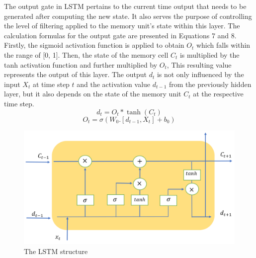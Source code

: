 \documentclass{article}
\begin{document}
The output gate in LSTM pertains to the current time output that needs to be generated after computing the new state. It also serves the purpose of controlling the level of filtering applied to the memory unit's state within this layer. The calculation formulas for the output gate are presented in Equations 7 and 8.  Firstly, the sigmoid activation function is applied to obtain  $O_t$  which falls within the range of  [0, 1]. Then, the state of the memory cell  $C_t$ is multiplied by the tanh activation function and further multiplied by  $O_t$, This resulting value represents the output of this layer. The output $d_t$ is not only influenced by the input $X_t$ at time step  $t$ and the activation value  $d_{t-1}$ from the previously hidden layer, but it also depends on the state of the memory unit  $C_t$ at the respective time step.
\begin{equation}
d_t=O_t*\tanh (C_t)
\end{equation}
\begin{equation}
O_t=\sigma (W_0.[d_{t-1},X_t] + b_0)
\end{equation}
\begin{figure}
	\centering
	\includegraphics[width=4.5 in]{LSTM.pdf}
	\caption{The LSTM structure}
	\label{2}
\end{figure}
\end{document}
